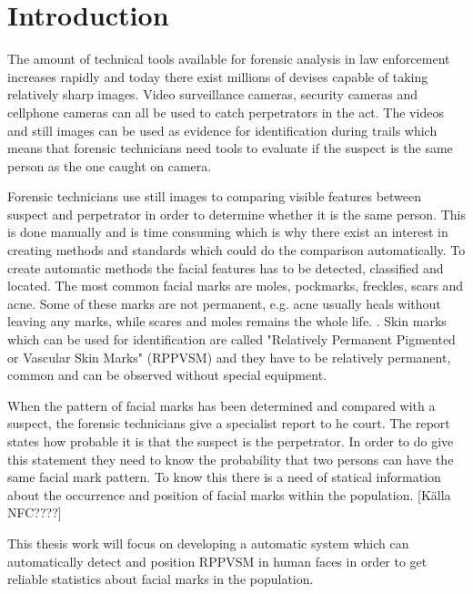 \documentclass{article}
\begin{document}
\setcounter{page}{1}


\section{Introduction}

The amount of technical tools available for forensic analysis in law enforcement increases rapidly and today there exist millions of devises capable of taking relatively sharp images. Video surveillance cameras, security cameras and cellphone cameras can all be used to catch perpetrators in the act. The videos and still images can be used as evidence for identification during trails which means that forensic technicians need tools to evaluate if the suspect is the same person as the one caught on camera.

Forensic technicians use still images to comparing visible features between suspect and perpetrator in order to determine whether it is the same person. This is done manually and is time consuming which is why there exist an interest in creating methods and standards which could do the comparison automatically. \cite{forensic_identification} To create automatic methods the facial features has to be detected, classified and located. The most common facial marks are moles, pockmarks, freckles, scars and acne. Some of these marks are not permanent, e.g. acne usually heals without leaving any marks, while scares and moles remains the whole life.    \cite{automatic_detector_2015}. Skin marks which can be used for identification are called "Relatively Permanent Pigmented or Vascular Skin Marks" (RPPVSM) and they have to be relatively permanent, common and can be observed without special equipment. \cite{statistic_RPPVSM}

When the pattern of facial marks has been determined and compared with a suspect, the forensic technicians give a specialist report to he court. The report states how probable it is that the suspect is the perpetrator. In order to do give this statement they need to know the probability that two persons can have the same facial mark pattern. To know this there is a need of statical information about the occurrence and position of facial marks within the population. [Källa NFC????]

This thesis work will focus on developing a automatic system which can automatically detect and position RPPVSM in human faces in order to get reliable statistics about facial marks in the population.   
\end{document}
